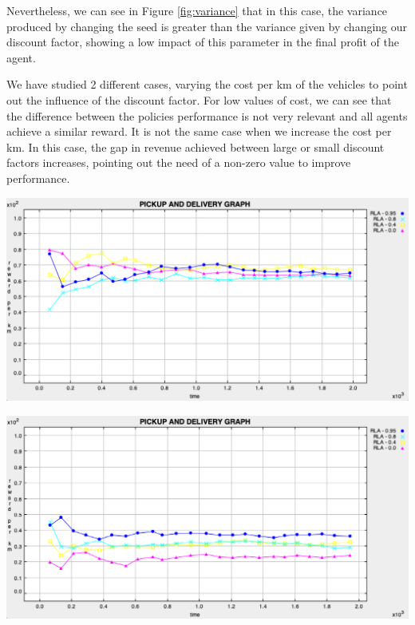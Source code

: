 \documentclass[11pt]{article}
\begin{document}
Nevertheless, we can see in Figure \ref{fig:variance} that in this case, the variance produced by changing the seed is greater than the variance given by changing our discount factor, showing a low impact of this parameter in the final profit of the agent. 

We have studied 2 different cases, varying the cost per km of the vehicles to point out the influence of the discount factor. For low values of cost, we can see that the difference between the policies performance is not very relevant and all agents achieve a similar reward. It is not the same case when we increase the cost per km. In this case, the gap in revenue achieved between large or small discount factors increases, pointing out the need of a non-zero value to improve performance. 

\begin{minipage}[]{0.45\textwidth}
\includegraphics[width=\textwidth]{2-reactive/doc/plots/2000ticks-cost5.png}
\label{fig:cost5}
\end{minipage}
\hfill
\begin{minipage}[]{0.45\textwidth}
\includegraphics[width=\textwidth]{2-reactive/doc/plots/2000ticks-cost50.png}
\label{fig:cost50}
\end{minipage}
\end{document}
